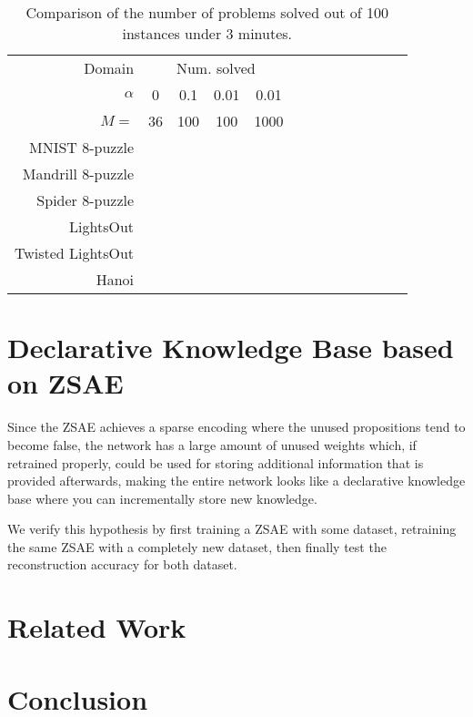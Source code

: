 \begin{table}
 \centering
 \begin{tabular}{|r|*{12}{c|}}
  Domain            & \multicolumn{4}{|c|}{Num. solved} \\
  $\alpha$          & 0  & 0.1 & 0.01 & 0.01 \\
  $M=$              & 36 & 100 & 100  & 1000 \\
  MNIST    8-puzzle & & & & \\
  Mandrill 8-puzzle & & & & \\
  Spider   8-puzzle & & & & \\
  LightsOut         & & & & \\
  Twisted LightsOut & & & & \\
  Hanoi             & & & & \\
 \end{tabular}
 \caption{Comparison of the number of problems solved out of 100 instances under 3 minutes.}
 \label{tab:planning}
\end{table}


\section{Declarative Knowledge Base based on ZSAE}

Since the ZSAE achieves a sparse encoding where the unused propositions
tend to become false, the network has a large amount of unused weights
which, if retrained properly, could be used for storing additional
information that is provided afterwards, making the entire network looks
like a declarative knowledge base where you can incrementally store
new knowledge.

We verify this hypothesis by first training a ZSAE with some dataset, retraining the same ZSAE with
a completely new dataset, then finally test the reconstruction accuracy for both dataset.

\section{Related Work}






\section{Conclusion}

